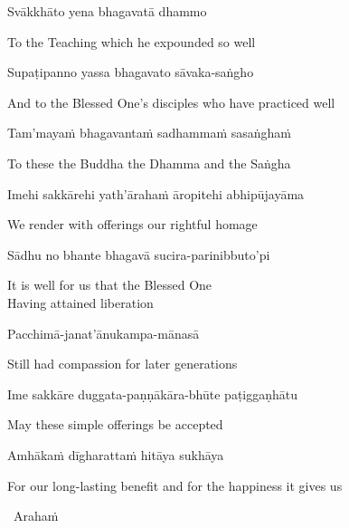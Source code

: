 Svākkhāto yena bhagavatā dhammo

\begin{english}
  To the Teaching which he expounded so well
\end{english}

Supaṭipanno yassa bhagavato sāvaka-saṅgho

\begin{english-hang}
  And to the Blessed One's disciples who have practiced well
\end{english-hang}

Tam'mayaṁ bhagavantaṁ sadhammaṁ sasaṅghaṁ

\begin{english}
  To these the Buddha the Dhamma and the Saṅgha
\end{english}

Imehi sakkārehi yath'ārahaṁ āropitehi abhipūjayāma

\begin{english}
  We render with offerings our rightful homage
\end{english}

Sādhu no bhante bhagavā sucira-parinibbuto'pi

\begin{english}
  It is well for us that the Blessed One\\
  Having attained liberation
\end{english}

Pacchimā-janat'ānukampa-mānasā

\begin{english}
  Still had compassion for later generations
\end{english}

\ifninebythirteen\clearpage\fi

Ime sakkāre duggata-paṇṇākāra-bhūte paṭiggaṇhātu

\begin{english}
  May these simple offerings be accepted
\end{english}

Amhākaṁ dīgharattaṁ hitāya sukhāya

\begin{english-hang}
  For our long-lasting benefit and for the happiness it gives us
\end{english-hang}

\ifafive\clearpage\fi
\ifbfive\clearpage\fi

\begin{leader}
  \anglebracketleft\ \hspace{-0.5mm}Arahaṁ \hspace{-0.5mm}\anglebracketright\
\end{leader}

